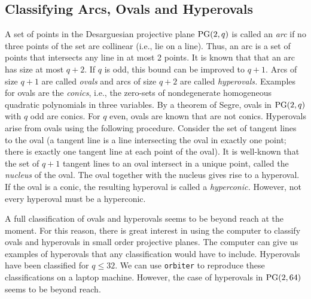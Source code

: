 
\subsection{Classifying Arcs, Ovals and Hyperovals}


A set of points in the Desarguesian 
projective plane ${\rm PG}(2,q)$ 
is called an {\em arc} 
if no three points of the set are collinear (i.e., lie on a line). 
Thus, an arc is a set of points that intersects any line in at most 2 points. 
It is known that that an arc has 
size at most $q+2.$ If $q$ is odd, this bound can be improved to $q+1.$
Arcs of size $q+1$ are called {\em ovals} and arcs of size $q+2$ are called {\em hyperovals.} 
Examples for ovals are the {\em conics}, i.e., the zero-sets of nondegenerate homogeneous quadratic polynomials in three 
variables.
By a theorem of Segre, ovals in ${\rm PG}(2,q)$ with $q$ odd are conics.  
For $q$ even, ovals are known that are 
not conics. 
Hyperovals arise from ovals using the following procedure. 
Consider the set of tangent lines to the oval 
(a tangent line is a line intersecting the oval in exactly one point; there is exactly one tangent line 
at each point of the oval). 
It is well-known that the set of $q+1$ tangent lines to an oval 
intersect in a unique point, called the {\em nucleus} of the oval. 
The oval together with the nucleus gives rise to a hyperoval.
If the oval is a conic, the resulting hyperoval is called a {\em hyperconic.}
However, not every hyperoval must be a hyperconic. 

\bigskip

A full classification of ovals and hyperovals 
seems to be beyond reach at the moment.
For this reason, there is great interest in 
using the computer to classify ovals and hyperovals in 
small order projective planes.
The computer can give us examples of hyperovals that any classification would 
have to include.
Hyperovals have been classified for $q \le 32.$ 
We can use \verb'orbiter' to reproduce these classifications 
on a laptop machine. 
However, the case of hyperovals in ${\rm PG}(2,64)$ seems 
to be beyond reach. 

\bigskip

